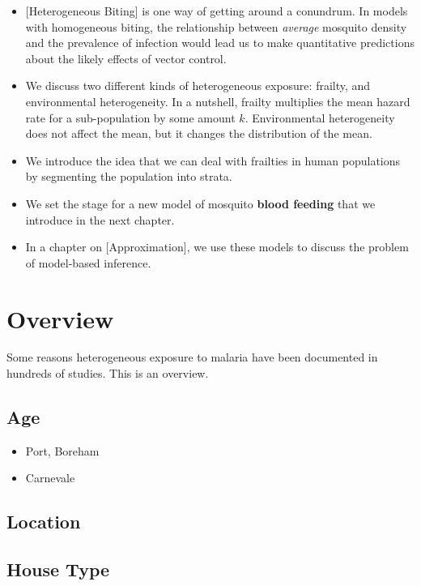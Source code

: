 \documentclass[
]{book}
\begin{document}
\begin{itemize}
\item
  {[}Heterogeneous Biting{]} is one way of getting around a conundrum. In models with homogeneous biting, the relationship between \emph{average} mosquito density and the prevalence of infection would lead us to make quantitative predictions about the likely effects of vector control.
\item
  We discuss two different kinds of heterogeneous exposure: frailty, and environmental heterogeneity. In a nutshell, frailty multiplies the mean hazard rate for a sub-population by some amount \(k\). Environmental heterogeneity does not affect the mean, but it changes the distribution of the mean.
\item
  We introduce the idea that we can deal with frailties in human populations by segmenting the population into strata.
\item
  We set the stage for a new model of mosquito \textbf{blood feeding} that we introduce in the next chapter.
\item
  In a chapter on {[}Approximation{]}, we use these models to discuss the problem of model-based inference.
\end{itemize}

\section{Overview}\label{overview}

Some reasons heterogeneous exposure to malaria have been documented in hundreds of studies. This is an overview.

\subsection{Age}\label{age-1}

\begin{itemize}
\item
  Port, Boreham
\item
  Carnevale
\end{itemize}

\subsection{Location}\label{location}

\subsection{House Type}\label{house-type}
\end{document}
